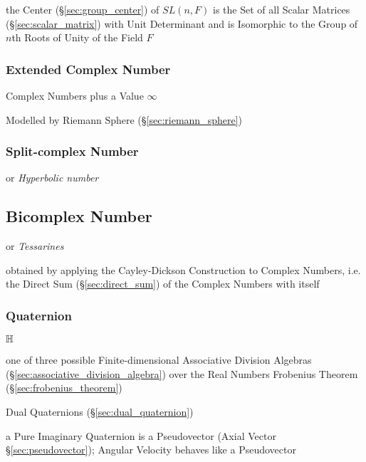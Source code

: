 the Center (\S\ref{sec:group_center}) of $SL(n,F)$ is the Set of all Scalar
Matrices (\S\ref{sec:scalar_matrix}) with Unit Determinant and is Isomorphic to
the Group of $n$th Roots of Unity of the Field $F$



\subsubsection{Extended Complex Number}\label{sec:extended_complex}

Complex Numbers plus a Value $\infty$

Modelled by Riemann Sphere (\S\ref{sec:riemann_sphere})



\subsubsection{Split-complex Number}\label{sec:split_complex}

or \emph{Hyperbolic number}



\subsection{Bicomplex Number}\label{sec:bicomplex_number}

or \emph{Tessarines}

obtained by applying the Cayley-Dickson Construction to Complex Numbers, i.e.
the Direct Sum (\S\ref{sec:direct_sum}) of the Complex Numbers with itself



\subsubsection{Quaternion}\label{sec:quaternion}

$\mathbb{H}$

one of three possible Finite-dimensional Associative Division Algebras
(\S\ref{sec:associative_division_algebra}) over the Real Numbers \fist
Frobenius Theorem (\S\ref{sec:frobenius_theorem})

\fist Dual Quaternions (\S\ref{sec:dual_quaternion})

a Pure Imaginary Quaternion is a Pseudovector (Axial Vector
\S\ref{sec:pseudovector}); Angular Velocity behaves like a Pseudovector

